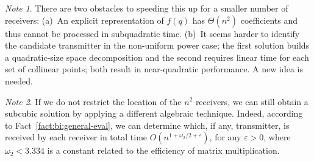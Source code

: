 \documentclass[11pt]{article}
\theoremstyle{remark}
\newtheorem*{note}{Note}
\let\eps\varepsilon
\begin{document}
\begin{note}
  There are two obstacles to speeding this up for a smaller number of receivers: (a)~An explicit representation of $f(q)$ has $\Theta(n^2)$ coefficients and thus cannot be processed in subquadratic time.  (b)~It seems harder to identify the candidate transmitter in the non-uniform power case; the first solution builds a quadratic-size space decomposition and the second requires linear time for each set of collinear points; both result in near-quadratic performance.  A new idea is needed.
\end{note}

\begin{note}
  If we do not restrict the location of the $n^2$ receivers, we can still obtain a subcubic solution by applying a different algebraic technique. Indeed, according to Fact~\ref{fact:bi:general-eval}, we can determine which, if any, transmitter, is received by each receiver in total time $O(n^{1+\omega_2/2+\eps})$, for any $\eps>0$, where $\omega_2<3.334$ is a constant related to the efficiency of matrix multiplication.    
\end{note}
\fi
\end{document}
